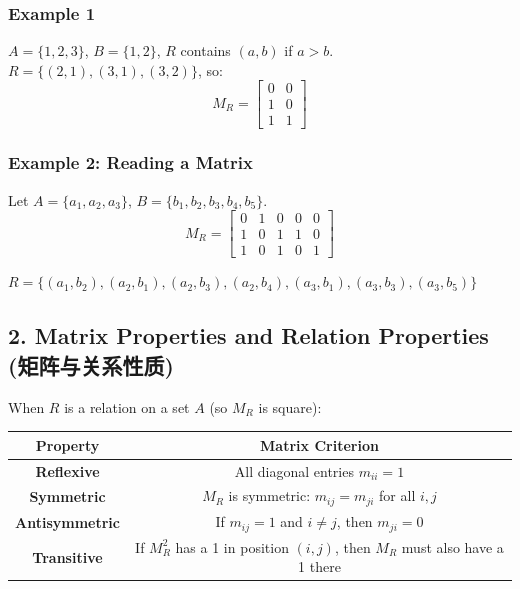 \documentclass[10pt,a4paper,openany]{ctexbook}
\theoremstyle{definition}
\theoremstyle{remark}
\begin{document}
\subsubsection{Example 1}

$A = \{1, 2, 3\}$, $B = \{1, 2\}$, $R$ contains $(a,b)$ if $a > b$.
$R = \{(2,1), (3,1), (3,2)\}$, so:
\[
M_R = \begin{bmatrix}
0 & 0 \\
1 & 0 \\
1 & 1
\end{bmatrix}
\]

\subsubsection{Example 2: Reading a Matrix}

Let $A = \{a_1, a_2, a_3\}$, $B = \{b_1, b_2, b_3, b_4, b_5\}$.
\[
M_R = \begin{bmatrix}
0 & 1 & 0 & 0 & 0 \\
1 & 0 & 1 & 1 & 0 \\
1 & 0 & 1 & 0 & 1
\end{bmatrix}
\]

$R = \{(a_1, b_2), (a_2, b_1), (a_2, b_3), (a_2, b_4), (a_3, b_1), (a_3, b_3), (a_3, b_5)\}$
\vspace{-2pt}

\subsection{2. Matrix Properties and Relation Properties (矩阵与关系性质)}

When $R$ is a relation on a set $A$ (so $M_R$ is square):
\begin{center}
\begin{tabular}{cc}
\hline
Property & Matrix Criterion \\ \hline
\textbf{Reflexive} & All diagonal entries $m_{ii} = 1$ \\
\textbf{Symmetric} & $M_R$ is symmetric: $m_{ij} = m_{ji}$ for all $i, j$ \\
\textbf{Antisymmetric} & If $m_{ij} = 1$ and $i \neq j$, then $m_{ji} = 0$ \\
\textbf{Transitive} & If $M_R^2$ has a 1 in position $(i,j)$, then $M_R$ must also have a 1 there \\
\hline
\end{tabular}

\end{center}
\end{document}
